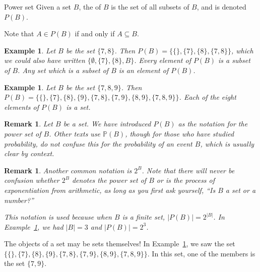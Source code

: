 \documentclass{book}
\newcounter{ekcounter}%
\theoremstyle{ekimcustom}
\newtheorem{example}[ekcounter]{Example}
\newtheorem{remark}[ekcounter]{Remark}
\newcommand\defn[1]{{\color{blue}{\bf #1}}}
\begin{document}
\begin{bdefinition}{Power set}{}
Given a set $B$, the \defn{power set} of $B$ is the set of all subsets of $B$, and is denoted $P(B)$.
\end{bdefinition}
Note that $A \in P(B)$ if and only if $A \subseteq B$.
\begin{example}
Let $B$ be the set $\{7,8\}$. Then $P(B) = \{ \{\}, \{7\}, \{8\},\{7,8\} \}$, which we could also have written  $ \{ \emptyset, \{7\}, \{8\}, B\}$. Every element of $P(B)$ is a subset of $B$. Any set which is a subset of $B$ is an element of $P(B)$. 
\end{example}
\begin{example}\label{example:power-set-789}
Let $B$ be the set $\{7,8,9\}$. Then $P(B) = \{ \{\}, \{7\}, \{8\}, \{9\}, \{7,8\}, \{7,9\}, \{8,9\}, \{7,8,9\}\}$. Each of the eight elements of $P(B)$ is a set.
\end{example}
\begin{remark}
Let $B$ be a set. We have introduced $P(B)$ as the notation for the power set of $B$. Other texts use $\mathbb{P}(B)$, though for those who have studied probability, do not confuse this for the probability of an event $B$, which is usually clear by context.
\end{remark}
\begin{remark}\label{remark:power-set-notation-with-2}
Another common notation is $2^B$. Note that there will never be confusion whether $2^B$ denotes the power set of $B$ or is the process of exponentiation from arithmetic, as long as you first ask yourself, ``Is $B$ a set or a number?''

This notation is used because when $B$ is a finite set, $|P(B)|=2^{|B|}$. In Example~\ref{example:power-set-789}, we had $|B|=3$ and $|P(B)|=2^3$.
\end{remark}

\begin{bremark}{}{}
The objects of a set may be sets themselves! In Example~\ref{example:power-set-789}, we saw the set $\{ \{\}, \{7\}, \{8\}, \{9\}, \{7,8\}, \{7,9\}, \{8,9\}, \{7,8,9\}\}$. In this set, one of the members is the set $\{7,9\}$.
\end{bremark}
\end{document}
